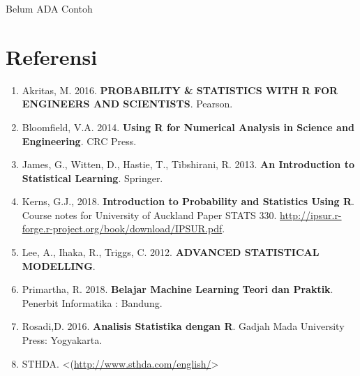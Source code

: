 \documentclass[
]{book}
\providecommand{\tightlist}{%
  \setlength{\itemsep}{0pt}\setlength{\parskip}{0pt}}
\theoremstyle{definition}
\theoremstyle{definition}
\theoremstyle{definition}
\theoremstyle{definition}
\theoremstyle{remark}
\begin{document}
Belum ADA Contoh

\hypertarget{referensi-11}{%
\section{Referensi}\label{referensi-11}}

\begin{enumerate}
\def\labelenumi{\arabic{enumi}.}
\tightlist
\item
  Akritas, M. 2016. \textbf{PROBABILITY \& STATISTICS WITH R FOR ENGINEERS AND SCIENTISTS}. Pearson.
\item
  Bloomfield, V.A. 2014. \textbf{Using R for Numerical Analysis in Science and Engineering}. CRC Press.
\item
  James, G., Witten, D., Hastie, T., Tibshirani, R. 2013. \textbf{An Introduction to Statistical Learning}. Springer.
\item
  Kerns, G.J., 2018. \textbf{Introduction to Probability and Statistics Using R}. Course notes for University of Auckland Paper STATS 330. \url{http://ipsur.r-forge.r-project.org/book/download/IPSUR.pdf}.
\item
  Lee, A., Ihaka, R., Triggs, C. 2012. \textbf{ADVANCED STATISTICAL MODELLING}.
\item
  Primartha, R. 2018. \textbf{Belajar Machine Learning Teori dan Praktik}. Penerbit Informatika : Bandung.
\item
  Rosadi,D. 2016. \textbf{Analisis Statistika dengan R}. Gadjah Mada University Press: Yogyakarta.
\item
  STHDA. \textless(\url{http://www.sthda.com/english/}\textgreater{}
\end{enumerate}

  
\end{document}
